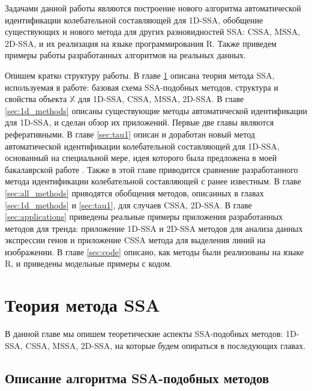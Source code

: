 \documentclass[specialist,
               substylefile = spbu.rtx,
               subf,href,colorlinks=true, 12pt]{disser}
\begin{document}
Задачами данной работы являются построение нового алгоритма автоматической идентификации колебательной составляющей для 1D-SSA, обобщение существующих и нового метода для других разновидностей SSA: CSSA, MSSA, 2D-SSA, и их реализация на языке программирования R.
Также приведем примеры работы разработанных алгоритмов на реальных данных.

Опишем кратко структуру работы. В главе \ref{sec:ssa_theory} описана теория метода SSA, используемая в работе: базовая схема SSA-подобных методов, структура и свойства объекта $\mathbb{X}$ для 1D-SSA, CSSA, MSSA, 2D-SSA.
В главе \ref{sec:1d_methods} описаны существующие методы автоматической идентификации для 1D-SSA, и сделан обзор их приложений.
Первые две главы являются реферативными. В главе \ref{sec:tau1} описан и  доработан новый метод автоматической идентификации колебательной составляющей для 1D-SSA, основанный на специальной мере, идея которого была предложена в моей бакалаврской работе \cite{Zhornikova2016}. Также в этой главе приводится сравнение разработанного метода идентификации колебательной составляющей с ранее известным. 
В главе \ref{sec:all_methods} приводятся обобщения методов, описанных в главах \ref{sec:1d_methods} и \ref{sec:tau1}, для случаев CSSA, 2D-SSA.
В главе \ref{sec:applications} приведены реальные примеры приложения разработанных методов для тренда:
приложение 1D-SSA и 2D-SSA методов для анализа данных экспрессии генов и приложение CSSA метода для выделения линий на изображении. В главе \ref{sec:code} описано, как методы были реализованы на языке R, и приведены модельные примеры с кодом.


\chapter{Теория метода SSA}
\label{sec:ssa_theory}

В данной главе мы опишем теоретические аспекты SSA-подобных методов: 1D-SSA, CSSA, MSSA, 2D-SSA, на которые будем опираться в последующих главах.

\section{Описание алгоритма SSA-подобных методов}
\label{sec:ssa_alg}
\end{document}
